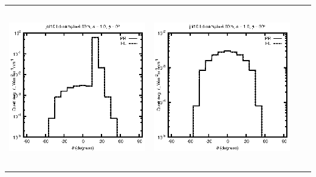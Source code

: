 \begin{tabular}{c c c c}
\includegraphics[height=7cm]{../eps/jol10_Ld_sample_4.00m_fwd.eps} &
\includegraphics[height=7cm]{../eps/jol10_Ld_sample_4.00m_cross.eps} \\
\end{tabular}

\pagebreak

